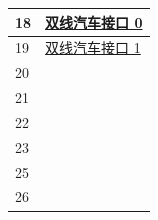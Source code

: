 \documentclass[main\_\_CN.tex]{subfiles}
\begin{document}
\begin{table}[H]
\begin{tabular}{|l|l|}
18                                  &       \hyperref[mod:twai]{双线汽车接口 0}         \\ \hline
19                                  &       \hyperref[mod:twai]{双线汽车接口 1}         \\ \hline
20                                  &       \nameref{mod:pcnt}         \\ \hline
21                                  &       \nameref{mod:mcpwm}         \\ \hline
22                                  &       \nameref{mod:evntaskmatrix}         \\ \hline
23                                  &       \nameref{mod:parlio}         \\ \hline
25                                  &       \nameref{mod:dbgassist}         \\ \hline
26                                  &       \nameref{mod:iomuxgpio}         \\ \hline
\end{tabular}
\end{table}
\end{document}
